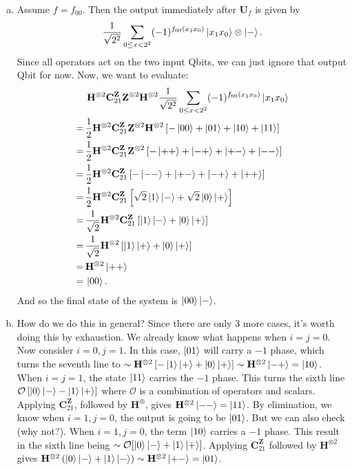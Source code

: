 \documentclass{book}
\theoremstyle{definition}
\newcommand{\nn}{\nonumber}
\newcommand{\f}[2]{\frac{#1}{#2}}
\newcommand{\lp}{\left(}
\newcommand{\rp}{\right)}
\newcommand{\lb}{\left[}
\newcommand{\rb}{\right]}
\newcommand{\U}{\mathbf{U}}
\newcommand{\Z}{\mathbf{Z}}
\newcommand{\had}{\mathbf{H}}
\begin{document}
\begin{enumerate}[(a)]
	
	
	\item Assume $f = f_{00}$. Then the output immediately after $\U_f$ is given by
	\begin{align}
	\f{1}{\sqrt{2^2}}\sum_{0 \leq x < 2^2}(-1)^{f_{00}(x_1x_0)}\ket{x_1x_0} \otimes \ket{ - }.
	\end{align}   
	Since all operators act on the two input Qbits, we can just ignore that output Qbit for now. Now, we want to evaluate:
	\begin{align}
	&\,\had^{\otimes 2}\mathbf{C}_{21}^\Z\Z^{\otimes 2}\had^{\otimes 2}\f{1}{\sqrt{2^2}}\sum_{0 \leq x < 2^2}(-1)^{f_{00}(x_1x_0)}\ket{x_1x_0}\nn\\
	=\,& \f{1}{2}\had^{\otimes 2}\mathbf{C}_{21}^\Z \Z^{\otimes 2}\had^{\otimes 2}\lb -\ket{00} + \ket{01} +  \ket{10} + \ket{11} \rb\nn\\
	=\,& \f{1}{2}\had^{\otimes 2}\mathbf{C}_{21}^\Z \Z^{\otimes 2} \lb -\ket{++} + \ket{-+} + \ket{+-} + \ket{--}  \rb\nn\\
	=\,& \f{1}{2}\had^{\otimes 2}\mathbf{C}_{21}^\Z \lb -\ket{--} + \ket{+-} + \ket{-+} + \ket{++} \rb\nn\\
	=\,& \f{1}{2}\had^{\otimes 2}\mathbf{C}_{21}^\Z \lb \sqrt{2}\ket{1}\ket{-} + \sqrt{2}\ket{0} \ket{+} \rb\nn\\
	=\,& \f{1}{\sqrt{2}}\had^{\otimes 2}\mathbf{C}_{21}^\Z\lb \ket{1}\ket{-} + \ket{0} \ket{+} \rb\nn\\
	=\,& \f{1}{\sqrt{2}}\had^{\otimes 2} \lb \ket{1}\ket{+} + \ket{0}\ket{+} \rb\nn\\
	=\,& \had^{\otimes 2}\ket{++}\nn\\
	=\,& \ket{00}.
	\end{align}
	And so the final state of the system is $\ket{00}\ket{ - }$. 
	
	
	
	
	\item How do we do this in general? Since there are only 3 more cases, it's worth doing this by exhaustion. We already know what happens when $i=j=0$. Now consider $i=0, j=1$. In this case, $\ket{01}$ will carry a $-1$ phase, which turns the seventh line to $\sim \had^{\otimes 2} \lb -\ket{1}\ket{+} + \ket{0}\ket{+} \rb \sim \had^{\otimes 2}\ket{-+} = \ket{10}$. When $i=j=1$, the state $\ket{11}$ carries the $-1$ phase. This turns the sixth line $\mathcal{O}\lb \ket{0}\ket{-} - \ket{1}\ket{+} \rb$ where $\mathcal{O}$ is a combination of operators and scalars. Applying $\mathbf{C}_{21}^{\Z}$, followed by $\had^{\otimes}$, gives $\had^{\otimes 2}\ket{--} = \ket{11}$. By elimination, we know when $i=1,j=0$, the output is going to be $\ket{01}$. But we can also check (why not?). When $i=1,j=0$, the term $\ket{10}$ carries a $-1$ phase. This result in the sixth line being $\sim \mathcal{O}[\ket{0}\ket{-} + \ket{1}\ket{+}]$. Applying $\mathbf{C}_{21}^{\Z}$ followed by $\had^{\otimes 2}$ gives $\had^{\otimes 2} \lp \ket{0}\ket{-} + \ket{1}\ket{-} \rp \sim \had^{\otimes 2}\ket{+-} = \ket{01}$. \\
	

\end{enumerate}
\end{document}

